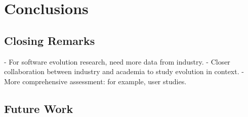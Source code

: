
\chapter{Conclusions}
\label{Conclusion}

% 
% 
%



\section{Closing Remarks}
- For software evolution research, need more data from industry.
- Closer collaboration between industry and academia to study evolution in context.
- More comprehensive assessment: for example, user studies.

\section{Future Work}
\label{sec:future_work}

